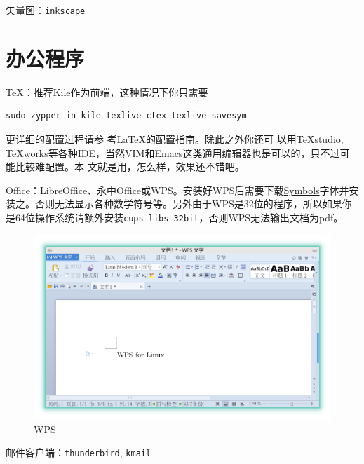 \documentclass[11pt,openany]{book}
\newcommand{\soft}[1]{\texttt{\textcolor{dgreen}{#1}}}
\begin{document}
矢量图：\soft{inkscape}
\section{办公程序}
\TeX ：推荐Kile作为前端，这种情况下你只需要
\begin{Verbatim}[formatcom=\color{codec}]
    sudo zypper in kile texlive-ctex texlive-savesym
\end{Verbatim}
更详细的配置过程请参
考\LaTeX 的\href{https://forum.suse.org.cn/viewtopic.php?f=6&t=2392&p=18750}{配置指南}。除此之外你还可
以用\TeX studio, \TeX works等各种IDE，当然VIM和Emacs这类通用编辑器也是可以的，只不过可能比较难配置。本
文就是用，怎么样，效果还不错吧。

Office：LibreOffice、永中Office或WPS。安装好WPS后需要下载\href{http://pan.baidu.com/s/1ntMEU2P}{Symbols}字体并安装之。否则无法显示各种数学符号等。另外由于WPS是32位的程序，所以如果你是64位操作系统请额外安装\soft{cups-libs-32bit}，否则WPS无法输出文档为pdf。
\begin{figure}[htbp]
\centering
\includegraphics[width=\textwidth]{./pic/wps.png} 
\caption{WPS}\label{wps}
\end{figure}
邮件客户端：\soft{thunderbird}, \soft{kmail}
\end{document}
